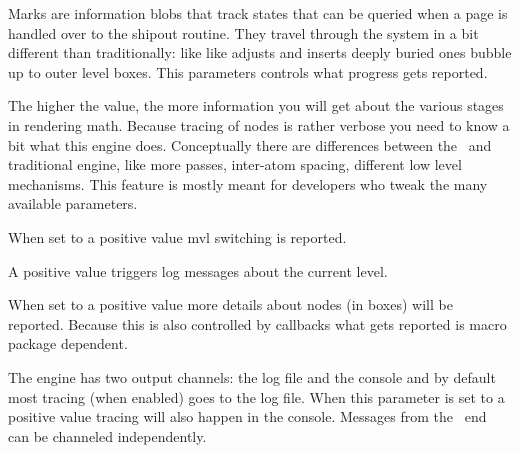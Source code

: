\stopoldprimitive

\startnewprimitive[title={\prm {tracingmarks}}]

Marks are information blobs that track states that can be queried when a page is
handled over to the shipout routine. They travel through the system in a bit
different than traditionally: like like adjusts and inserts deeply buried ones
bubble up to outer level boxes. This parameters controls what progress gets
reported.

\stopnewprimitive

\startnewprimitive[title={\prm {tracingmath}}]

The higher the value, the more information you will get about the various stages
in rendering math. Because tracing of nodes is rather verbose you need to know a
bit what this engine does. Conceptually there are differences between the
\LUAMETATEX\ and traditional engine, like more passes, inter-atom spacing,
different low level mechanisms. This feature is mostly meant for developers who
tweak the many available parameters.

\stopnewprimitive

\startnewprimitive[title={\prm {tracingmvl}}]

When set to a positive value mvl switching is reported.

\stopnewprimitive

\startoldprimitive[title={\prm {tracingnesting}}]

A positive value triggers log messages about the current level.

\stopoldprimitive

\startnewprimitive[title={\prm {tracingnodes}}]

When set to a positive value more details about nodes (in boxes) will be
reported. Because this is also controlled by callbacks what gets reported is
macro package dependent.

\stopnewprimitive

\startoldprimitive[title={\prm {tracingonline}}]

The engine has two output channels: the log file and the console and by default
most tracing (when enabled) goes to the log file. When this parameter is set to a
positive value tracing will also happen in the console. Messages from the \LUA\
end can be channeled independently.

\stopoldprimitive

\startnewprimitive[title={\prm {tracingorphans}}]

